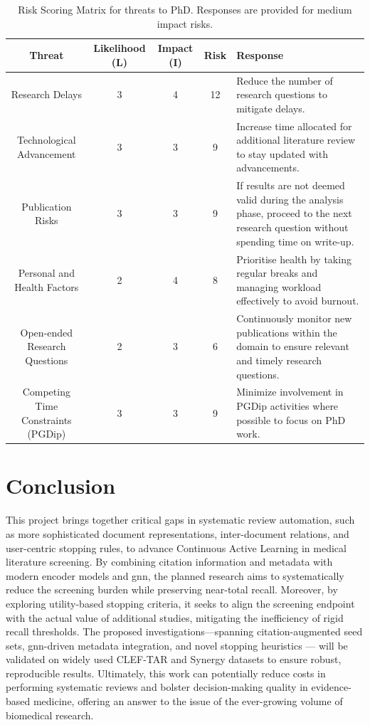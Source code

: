 \documentclass[10pt,oneside]{book}
\begin{document}
\begin{landscape}
\begin{table}[t]
\centering
\footnotesize
\begin{tabular}{|c|c|c|c|>{\raggedright\arraybackslash}p{10cm}|}
\hline
\textbf{Threat} & \textbf{Likelihood (L)} & \textbf{Impact (I)} & \textbf{Risk} & \textbf{Response} \\
\hline
Research Delays & 3 & 4 & 12 & Reduce the number of research questions to mitigate delays. \\
\hline
Technological Advancement & 3 & 3 & 9 & Increase time allocated for additional literature review to stay updated with advancements. \\
\hline
Publication Risks & 3 & 3 & 9 & If results are not deemed valid during the analysis phase, proceed to the next research question without spending time on write-up. \\
\hline
Personal and Health Factors & 2 & 4& 8  & Prioritise health by taking regular breaks and managing workload effectively to avoid burnout. \\
\hline
Open-ended Research Questions & 2 & 3 & 6 & Continuously monitor new publications within the domain to ensure relevant and timely research questions. \\
\hline
Competing Time Constraints (PGDip) & 3 & 3 & 9 & Minimize involvement in PGDip activities where possible to focus on PhD work. \\
\hline
\end{tabular}
\caption{Risk Scoring Matrix for threats to PhD. Responses are provided for medium impact risks.}
\label{tab:risk_matrix}
\end{table}
\end{landscape}

\section{Conclusion}

 This project brings together critical gaps in systematic review automation, such as more sophisticated document representations, inter-document relations, and user-centric stopping rules, to advance Continuous Active Learning in medical literature screening. By combining citation information and metadata with modern encoder models and \gls*{gnn}, the planned research aims to systematically reduce the screening burden while preserving near-total recall. Moreover, by exploring utility-based stopping criteria, it seeks to align the screening endpoint with the actual value of additional studies, mitigating the inefficiency of rigid recall thresholds. The proposed investigations—spanning citation-augmented seed sets, \gls*{gnn}-driven metadata integration, and novel stopping heuristics — will be validated on widely used CLEF-TAR and Synergy datasets to ensure robust, reproducible results. Ultimately, this work can potentially reduce costs in performing systematic reviews and bolster decision-making quality in evidence-based medicine, offering an answer to the issue of the ever-growing volume of biomedical research.
\end{document}
